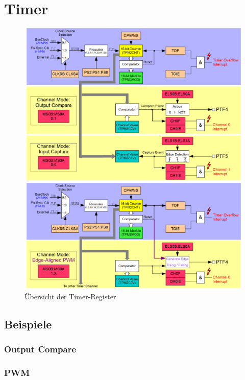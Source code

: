 \newpage
\section{Timer}

\begin{figure}[h!]
	\centering
	\includegraphics[width=1\textwidth]{../fig/timer.pdf}

	\includegraphics[width=1\textwidth]{../fig/pwm.pdf}
	\caption{Übersicht der Timer-Register}
\end{figure}

\newpage
\subsection{Beispiele}

\subsubsection{Output Compare}



\newpage
\subsubsection{PWM}

